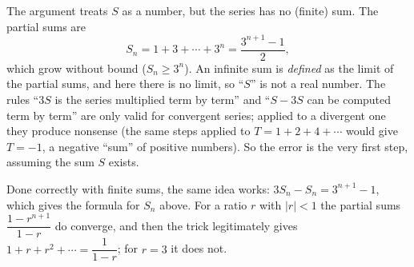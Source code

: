 The argument treats $S$ as a number, but the series has no (finite) sum. The partial sums are
\[
S_n=1+3+\cdots+3^n=\dfrac{3^{n+1}-1}{2},
\]
which grow without bound ($S_n\ge3^n$). An infinite sum is \emph{defined} as the limit of the partial sums, and here there is no limit, so ``$S$'' is not a real number. The rules ``$3S$ is the series multiplied term by term'' and ``$S-3S$ can be computed term by term'' are only valid for convergent series; applied to a divergent one they produce nonsense (the same steps applied to $T=1+2+4+\cdots$ would give $T=-1$, a negative ``sum'' of positive numbers). So the error is the very first step, assuming the sum $S$ exists.

Done correctly with finite sums, the same idea works: $3S_n-S_n=3^{n+1}-1$, which gives the formula for $S_n$ above. For a ratio $r$ with $|r|<1$ the partial sums $\dfrac{1-r^{n+1}}{1-r}$ do converge, and then the trick legitimately gives $1+r+r^2+\cdots=\dfrac{1}{1-r}$; for $r=3$ it does not.
